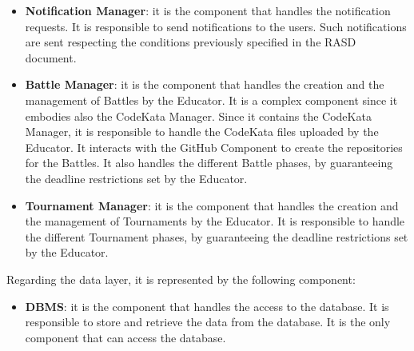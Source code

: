 \begin{itemize}
    \item \textbf{Notification Manager}: it is the component that handles the notification requests. It is responsible to send notifications to the users. Such notifications are sent respecting the conditions previously specified in the RASD document.
    \item \textbf{Battle Manager}: it is the component that handles the creation and the management of Battles by the Educator. It is a complex component since it embodies also the CodeKata Manager. Since it contains the CodeKata Manager, it is responsible to handle the CodeKata files uploaded by the Educator. It interacts with the GitHub Component to create the repositories for the Battles. It also handles the different Battle phases, by guaranteeing the deadline restrictions set by the Educator.
    \item \textbf{Tournament Manager}: it is the component that handles the creation and the management of Tournaments by the Educator. It is responsible to handle the different Tournament phases, by guaranteeing the deadline restrictions set by the Educator.
\end{itemize}
Regarding the data layer, it is represented by the following component:
\begin{itemize}
    \item \textbf{DBMS}: it is the component that handles the access to the database. It is responsible to store and retrieve the data from the database. It is the only component that can access the database.
\end{itemize}
